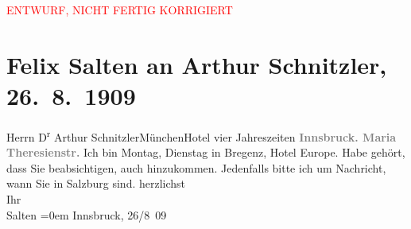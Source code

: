 
\begin{center}
            \textcolor{red}{ENTWURF, NICHT FERTIG KORRIGIERT}
                      \end{center}
            
         \renewcommand{\erwaehnteOrte}{Orte: Bregenz, Hotel Vier Jahreszeiten, Hotel de l’Europe, Innsbruck, Maria-Theresien-Straße, München, Salzburg}
         \renewcommand{\erwaehnteWerke}{}
               \section[Felix Salten an Arthur Schnitzler, 26. 8. 1909]{ Felix Salten an Arthur Schnitzler, 26. 8. 1909}\nopagebreak{}\rehead{ }\begin{ledgroupsized}[t]{13cm}\normalsize\beginnumbering \toendnotes[C]{\smallbreak\pagebreak[2]} 
\pstart{}{\pb}Herrn D\textsuperscript{r} Arthur Schnitzler\pend{}\pstart{}München\pend{}\pstart{}Hotel vier Jahreszeiten\pend{}{\bigskip}\pstart
           \noindent{}\centering{}{\pb}\textcolor{gray}{\textbf{Innsbruck. Maria Theresienstr.}}\pend
           \pstart
           Ich bin Montag, Dienstag in Bregenz, Hotel Europe. Habe gehört, dass Sie
               beabsichtigen, auch hinzukommen. Jedenfalls bitte ich um Nachricht, wann Sie in Salzburg sind.\pend
           \pstart
           herzlichst {\\[\baselineskip]}Ihr {\\[\baselineskip]}\spacefill\mbox{Salten}\pend
           \leftskip=0em{}\pstart
           Innsbruck, 26/8 09\pend
           
         
         \endnumbering{}\end{ledgroupsized}\begin{anhang}\end{anhang}\newcommand{\dateiname}{L03507}\newcommand{\titel}{Felix Salten an Arthur Schnitzler, 26. 8. 1909}\newcommand{\editorInnen}{Martin Anton Müller und Laura Untner}
      